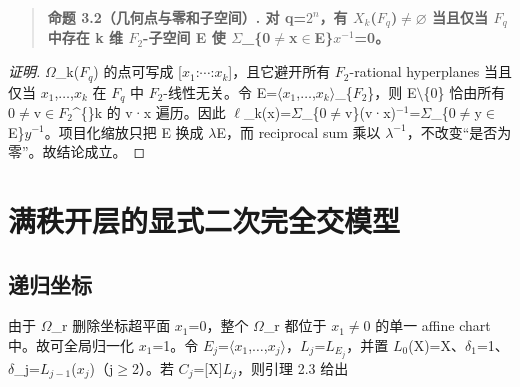 \documentclass[11pt]{ctexart}
\begin{document}
\begin{quote}\textbf{命题 3.2（几何点与零和子空间）. 对 q=\ensuremath{2^{n}}，有 \ensuremath{X_{k}}(\ensuremath{F_{q}})\ensuremath{\ne}\ensuremath{\varnothing} 当且仅当 \ensuremath{F_{q}} 中存在 k 维 \ensuremath{F_2}-子空间 E 使 \ensuremath{\Sigma}\_\{0\ensuremath{\ne}x\ensuremath{\in}E\}\ensuremath{x^{-1}}=0。}\end{quote}

\begin{proof}[证明] 

\ensuremath{\Omega}\_k(\ensuremath{F_{q}}) 的点可写成 [\ensuremath{x_1}:\ensuremath{\cdots}:\ensuremath{x_{k}}]，且它避开所有 \ensuremath{F_2}-rational hyperplanes 当且仅当 \ensuremath{x_1},\ensuremath{\ldots},\ensuremath{x_{k}} 在 \ensuremath{F_{q}} 中 \ensuremath{F_2}-线性无关。令 E=\ensuremath{\langle}\ensuremath{x_1},\ensuremath{\ldots},\ensuremath{x_{k}}\ensuremath{\rangle}\_\{\ensuremath{F_2}\}，则 E\ensuremath{\setminus}\{0\} 恰由所有 0\ensuremath{\ne}v\ensuremath{\in}\ensuremath{F_2}\textasciicircum\{\}k 的 v·x 遍历。因此 \ensuremath{\ell}\_k(x)=\ensuremath{\Sigma}\_\{0\ensuremath{\ne}v\}(v·x)\ensuremath{^{-1}}=\ensuremath{\Sigma}\_\{0\ensuremath{\ne}y\ensuremath{\in}E\}\ensuremath{y^{-1}}。项目化缩放只把 E 换成 \ensuremath{\lambda}E，而 reciprocal sum 乘以 \ensuremath{\ensuremath{\lambda}^{-1}}，不改变“是否为零”。故结论成立。

\end{proof}

\section{满秩开层的显式二次完全交模型}

\subsection{递归坐标}

由于 \ensuremath{\Omega}\_r 删除坐标超平面 \ensuremath{x_1}=0，整个 \ensuremath{\Omega}\_r 都位于 \ensuremath{x_1}\ensuremath{\ne}0 的单一 affine chart 中。故可全局归一化 \ensuremath{x_1}=1。令 \ensuremath{E_{j}}=\ensuremath{\langle}\ensuremath{x_1},\ensuremath{\ldots},\ensuremath{x_{j}}\ensuremath{\rangle}，\ensuremath{L_{j}}=\ensuremath{L_{E_j}}，并置 \ensuremath{L_{0}}(X)=X、\ensuremath{\ensuremath{\delta}_1}=1、\ensuremath{\delta}\_j=\ensuremath{L_{j−1}}(\ensuremath{x_{j}})（j\ensuremath{\ge}2）。若 \ensuremath{C_{j}}=[X]\ensuremath{L_{j}}，则引理 2.3 给出
\end{document}
